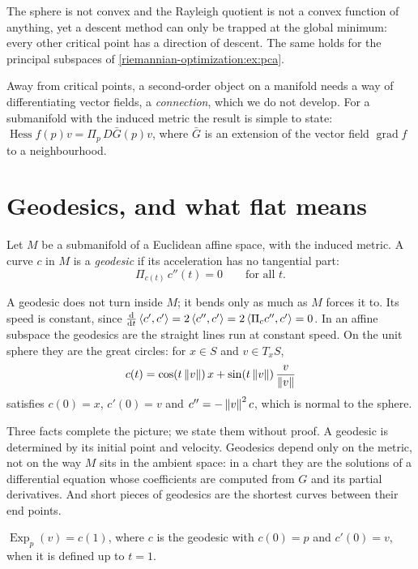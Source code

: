 \begin{notechapter}
\begin{intuition}
The sphere is not convex and the Rayleigh quotient is not a convex
function of anything, yet a descent method can only be trapped at the
global minimum: every other critical point has a direction of descent.
The same holds for the principal subspaces of
\cref{riemannian-optimization:ex:pca}.
\end{intuition}

Away from critical points, a second-order object on a manifold needs a
way of differentiating vector fields, a \emph{connection}, which we do
not develop. For a submanifold with the induced metric the result is
simple to state: $\operatorname{Hess}f(p)v = \Pi_p\,D\bar G(p)v$, where
$\bar G$ is an extension of the vector field $\operatorname{grad}f$ to a
neighbourhood.

\section{Geodesics, and what flat means}
\label{riemannian-optimization:sec:geodesics}

\begin{definition}[Geodesic]\label{riemannian-optimization:def:geodesic}
Let $M$ be a submanifold of a Euclidean affine space, with the induced
metric. A curve $c$ in $M$ is a \emph{geodesic} if its acceleration has
no tangential part:
\[
  \Pi_{c(t)}\,c''(t) = 0 \qquad\text{for all } t .
\]
\end{definition}

A geodesic does not turn inside $M$; it bends only as much as $M$ forces
it to. Its speed is constant, since
$\frac{\mathrm{d}}{\mathrm{d} t}\left\langle c', c' \right\rangle = 2\left\langle c'', c' \right\rangle
= 2\left\langle \Pi_cc'', c' \right\rangle = 0$. In an affine subspace the geodesics are the
straight lines run at constant speed. On the unit sphere they are the
great circles: for $x\in S$ and $v\in T_xS$,
\[
  c(t) = \cos(t\left\|v\right\|)\,x + \sin(t\left\|v\right\|)\,\frac v{\left\|v\right\|}
\]
satisfies $c(0) = x$, $c'(0) = v$ and $c'' = -\left\|v\right\|^2c$, which is
normal to the sphere.

Three facts complete the picture; we state them without proof. A geodesic
is determined by its initial point and velocity. Geodesics depend only on
the metric, not on the way $M$ sits in the ambient space: in a chart
they are the solutions of a differential equation whose coefficients are
computed from $G$ and its partial derivatives. And short pieces of
geodesics are the shortest curves between their end points.

\begin{definition}\label{riemannian-optimization:def:exp}
$\operatorname{Exp}_p(v) = c(1)$, where $c$ is the geodesic with
$c(0) = p$ and $c'(0) = v$, when it is defined up to $t = 1$.
\end{definition}


\end{notechapter}
